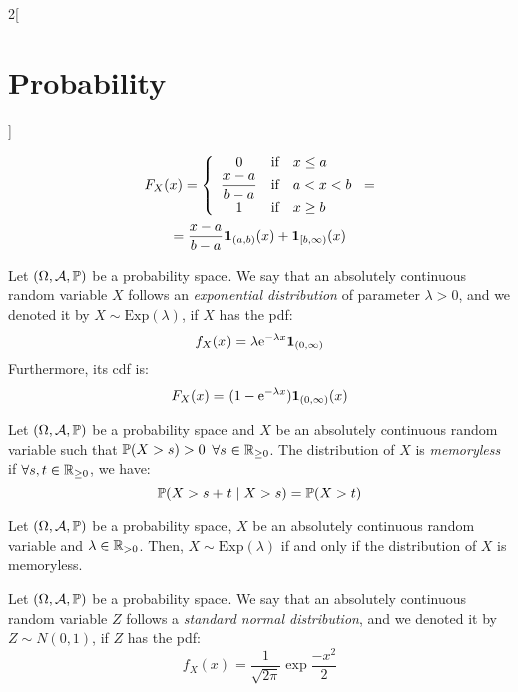 \documentclass[../../../main.tex]{subfiles}
\begin{document}
\begin{multicols}{2}[\section{Probability}]
\begin{definition}
        \begin{multline*}
            F_X(x)=\left\{
            \begin{array}{ccl}
                0                            & \text{if} & x\leq a \\
                \displaystyle\frac{x-a}{b-a} & \text{if} & a<x<b   \\
                1                            & \text{if} & x\geq b \\
            \end{array}
            \right.=\\=\frac{x-a}{b-a}\boldsymbol{\mathrm{1}}_{(a,b)}(x)+\boldsymbol{\mathrm{1}}_{[b,\infty)}(x)
        \end{multline*}
    \end{definition}
    \begin{definition}
        Let $(\Omega,\mathcal{A},\mathbb{P})$ be a probability space. We say that an absolutely continuous random variable $X$ follows an \textit{exponential distribution} of parameter $\lambda>0$, and we denoted it by $X\sim \text{Exp}(\lambda)$, if $X$ has the pdf: $$f_X(x)=\lambda\mathrm{e}^{-\lambda x}\boldsymbol{\mathrm{1}}_{(0,\infty)}$$ Furthermore, its cdf is:
        $$F_X(x)=(1-\mathrm{e}^{-\lambda x})\boldsymbol{\mathrm{1}}_{(0,\infty)}(x)$$
    \end{definition}
    \begin{definition}
        Let $(\Omega,\mathcal{A},\mathbb{P})$ be a probability space and $X$ be an absolutely continuous random variable such that $\mathbb{P}(X >s)>0$ $\forall s\in\mathbb{R}_{\geq 0}$. The distribution of $X$ is \textit{memoryless} if $\forall s,t\in\mathbb{R}_{\geq 0}$, we have: $$\mathbb{P}(X>s+t\mid X >s)=\mathbb{P}(X>t)$$
    \end{definition}
    \begin{prop}
        Let $(\Omega,\mathcal{A},\mathbb{P})$ be a probability space, $X$ be an absolutely continuous random variable and $\lambda\in\mathbb{R}_{>0}$. Then, $X\sim\text{Exp}(\lambda)$ if and only if the distribution of $X$ is memoryless.
    \end{prop}
    \begin{definition}
        Let $(\Omega,\mathcal{A},\mathbb{P})$ be a probability space. We say that an absolutely continuous random variable $Z$ follows a \textit{standard normal distribution}, and we denoted it by $Z\sim N(0,1)$, if $Z$ has the pdf: $$f_X(x)=\frac{1}{\sqrt{2\pi}}\exp{\frac{-x^2}{2}}$$
    \end{definition}
    \begin{definition}

\end{definition}
\end{multicols}
\end{document}
